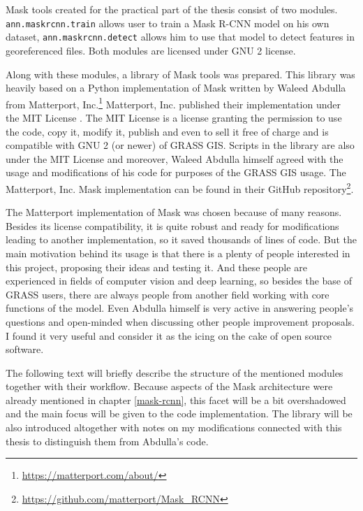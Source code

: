 Mask  tools created for the practical part of the thesis consist of 
two modules. \verb|ann.maskrcnn.train| allows user to train a Mask R-CNN model 
on his own dataset, \verb|ann.maskrcnn.detect| allows him to use that model to 
detect features in georeferenced files. Both modules are licensed under GNU  2 license.

Along with these modules, a library of Mask  tools was prepared. This 
library was heavily based on a Python implementation of Mask  written 
by Waleed Abdulla from Matterport, 
Inc.\footnote{\url{https://matterport.com/about/}}  Matterport, Inc. published 
their implementation under the MIT License \cite{mit}. The MIT License is a 
license granting the permission to use the code, copy it, modify it, publish and 
even to sell it free of charge and is compatible with GNU  
2 (or newer) \cite{gplv2} of GRASS GIS. Scripts in the library are also under 
the MIT License and moreover, Waleed Abdulla himself agreed with the usage and 
modifications of his code for purposes of the GRASS GIS usage. The Matterport, 
Inc. Mask  implementation can be found in their GitHub 
repository\footnote{\url{https://github.com/matterport/Mask\_RCNN}}.

The Matterport implementation of Mask  was chosen because of many 
reasons. Besides its license compatibility, it is quite robust and ready for 
modifications leading to another implementation, so it saved thousands of lines 
of code. But the main motivation behind its usage is that there is a plenty of 
people interested in this project, proposing their ideas and testing it. And 
these people are experienced in fields of computer vision and deep learning, so 
besides the base of GRASS  users, there are always people from another 
field working with core functions of the model. Even Abdulla himself is very 
active in answering people's questions and open-minded when discussing other 
people improvement proposals. I found it very useful and consider it as the 
icing on the cake of open source software.

The following text will briefly describe the structure of the mentioned modules 
together with their workflow. Because aspects of the Mask  
architecture were already mentioned in chapter \ref{mask-rcnn}, this facet will 
be a bit overshadowed and the main focus will be given to the code 
implementation. The library will be also introduced altogether with notes on my 
modifications connected with this thesis to distinguish them from Abdulla's 
code.

